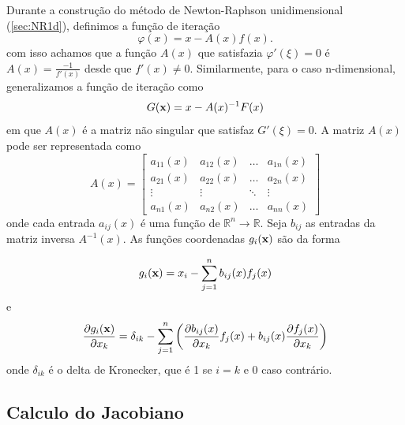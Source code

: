 Durante a construção do método de Newton-Raphson unidimensional (\ref{sec:NR1d}), definimos a função de iteração 
\begin{equation*}
\varphi(x) = x - {A(x)}{f(x)}.
\end{equation*}
com isso achamos que a função \(A(x)\) que satisfazia \(\varphi'(\xi) = 0\) é \(A(x) = \frac{-1}{f'(x)}\) desde que \(f'(x) \neq 0\). 
Similarmente, para o caso n-dimensional, generalizamos a função de iteração como
\begin{equation*}
    G(\textbf{x}) = x - A(x)^{-1} F(x)
\end{equation*}
em que \(A(x)\) é a matriz não singular que satisfaz \(G'(\xi) = 0\). A matriz \(A(x)\) pode ser representada como
\begin{equation}\label{matA}
    A(x) =  
    \begin{bmatrix}
        a_{11}(x) & a_{12}(x) & \ldots & a_{1n}(x) \\
        a_{21}(x) & a_{22}(x) & \ldots & a_{2n}(x) \\
        \vdots & \vdots & \ddots & \vdots \\
        a_{n1}(x) & a_{n2}(x) & \ldots & a_{nn}(x)
    \end{bmatrix}
\end{equation}
onde cada entrada  \(a_{ij}(x)\) é uma função de   \(\mathbb{R}^n \rightarrow  \mathbb{R}\). Seja \(b_{ij}\) as entradas da matriz inversa \(A^{-1}(x)\). As funções coordenadas  $g_{i}(\textbf{x})$ são da forma

\begin{equation}
    g_{i}(\textbf{x}) = x_i - \sum_{j=1}^{n} b_{ij}(x) f_j(x)
\end{equation}
e
\begin{equation}\label{sumInvA}
    \frac{\partial g_i(\textbf{x})}{\partial x_k} = \delta_{ik} - \sum_{j=1}^{n} \left( \frac{\partial b_{ij}(x)}{\partial x_k} f_j(x) + b_{ij}(x) \frac{\partial f_j(x)}{\partial x_k} \right)
\end{equation}
onde \(\delta_{ik}\) é o delta de Kronecker, que é 1 se \(i = k\) e 0 caso contrário.

\subsection{Calculo do Jacobiano}

